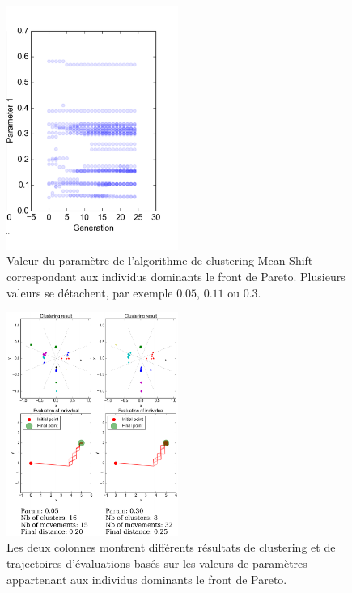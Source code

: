 \documentclass[draft]{llncs}
\begin{document}
\begin{figure}[ht]
  \begin{center}
    \includegraphics[width=0.5\textwidth]{figures/Pareto_front.pdf}
    \caption{Valeur du paramètre de l'algorithme de clustering Mean Shift correspondant aux individus dominants le front de Pareto. Plusieurs valeurs se détachent, par exemple $0.05$, $0.11$ ou $0.3$.}
    \label{fig:pareto_front}
  \end{center}
\end{figure}

\begin{figure}[ht]
  \begin{center}
    \includegraphics[width=0.5\textwidth]{figures/Benchmark_3.pdf}
    \caption{Les deux colonnes montrent différents résultats de clustering et de trajectoires d'évaluations basés sur les valeurs de paramètres appartenant aux individus dominants le front de Pareto.}
    \label{fig:results}
  \end{center}
\end{figure}
\end{document}
